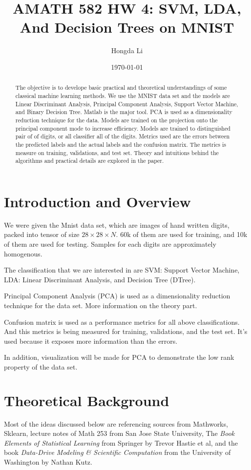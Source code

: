 \documentclass{article}
\title{AMATH 582 HW 4: SVM, LDA, And Decision Trees on MNIST}
\author{Hongda Li}
\date{\today}
\begin{document}
\maketitle

\begin{abstract}
   The objective is to develope basic practical and theoretical understandings of some classical machine learning methods. We use the MNIST data set and the models are Linear Discriminant Analysis, Principal Component Analysis, Support Vector Machine, and Binary Decision Tree. Matlab is the major tool. PCA is used as a dimensionality reduction technique for the data. Models are trained on the projection onto the principal component mode to increase efficiency. Models are trained to distinguished pair of of digits, or all classifier all of the digits. Metrics used are the errors between the predicted labels and the actual labels and the confusion matrix. The metrics is measure on training, validations, and test set. Theory and intuitions behind the algorithms and practical details are explored in the paper. 
\end{abstract}


\section{Introduction and Overview}
    \hspace{1.1em}
    We were given the Mnist data set, which are images of hand written digits, packed into tensor of size $28 \times 28 \times N$. 60k of them are used for training, and 10k of them are used for testing. Samples for each digits are approximately homogenous. 
    \par
    The classification that we are interested in are SVM: Support Vector Machine, LDA: Linear Discriminant Analysis, and Decision Tree (DTree). 
    \par
    Principal Component Analysis (PCA) is used as a dimensionality reduction technique for the data set. More information on the theory part. 
    \par
    Confusion matrix is used as a performance metrics for all above classifications. And this metrics is being measured for training, validations, and the test set. It's used because it exposes more information than the errors. 
    \par
    In addition, visualization will be made for PCA to demonstrate the low rank property of the data set. 

\section{Theoretical Background}
    \hspace{1.1em}
    Most of the ideas discussed below are referencing sources from Mathworks, Sklearn, lecture notes of Math 253 from San Jose State University, The \textit{Book Elements of Statistical Learning} from Springer by Trevor Hastie et al, and the book \textit{Data-Drive Modeling \& Scientific Computation} from the University of Washington by Nathan Kutz. 
\end{document}
